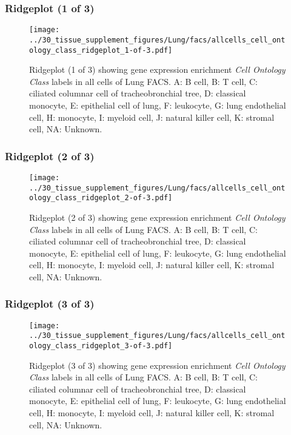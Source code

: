 \clearpage

\subsubsection{Ridgeplot (1 of 3)}
\begin{figure}[h]
\centering
\texttt{[image: ../30\_tissue\_supplement\_figures/Lung/facs/allcells\_cell\_ontology\_class\_ridgeplot\_1-of-3.pdf]}

\caption{ Ridgeplot (1 of 3)  showing gene expression enrichment \emph{Cell Ontology Class} labels in all cells of Lung FACS. A: B cell, B: T cell, C: ciliated columnar cell of tracheobronchial tree, D: classical monocyte, E: epithelial cell of lung, F: leukocyte, G: lung endothelial cell, H: monocyte, I: myeloid cell, J: natural killer cell, K: stromal cell, NA: Unknown.}
\end{figure}


\clearpage

\subsubsection{Ridgeplot (2 of 3)}
\begin{figure}[h]
\centering
\texttt{[image: ../30\_tissue\_supplement\_figures/Lung/facs/allcells\_cell\_ontology\_class\_ridgeplot\_2-of-3.pdf]}

\caption{ Ridgeplot (2 of 3)  showing gene expression enrichment \emph{Cell Ontology Class} labels in all cells of Lung FACS. A: B cell, B: T cell, C: ciliated columnar cell of tracheobronchial tree, D: classical monocyte, E: epithelial cell of lung, F: leukocyte, G: lung endothelial cell, H: monocyte, I: myeloid cell, J: natural killer cell, K: stromal cell, NA: Unknown.}
\end{figure}


\clearpage

\subsubsection{Ridgeplot (3 of 3)}
\begin{figure}[h]
\centering
\texttt{[image: ../30\_tissue\_supplement\_figures/Lung/facs/allcells\_cell\_ontology\_class\_ridgeplot\_3-of-3.pdf]}

\caption{ Ridgeplot (3 of 3)  showing gene expression enrichment \emph{Cell Ontology Class} labels in all cells of Lung FACS. A: B cell, B: T cell, C: ciliated columnar cell of tracheobronchial tree, D: classical monocyte, E: epithelial cell of lung, F: leukocyte, G: lung endothelial cell, H: monocyte, I: myeloid cell, J: natural killer cell, K: stromal cell, NA: Unknown.}
\end{figure}



